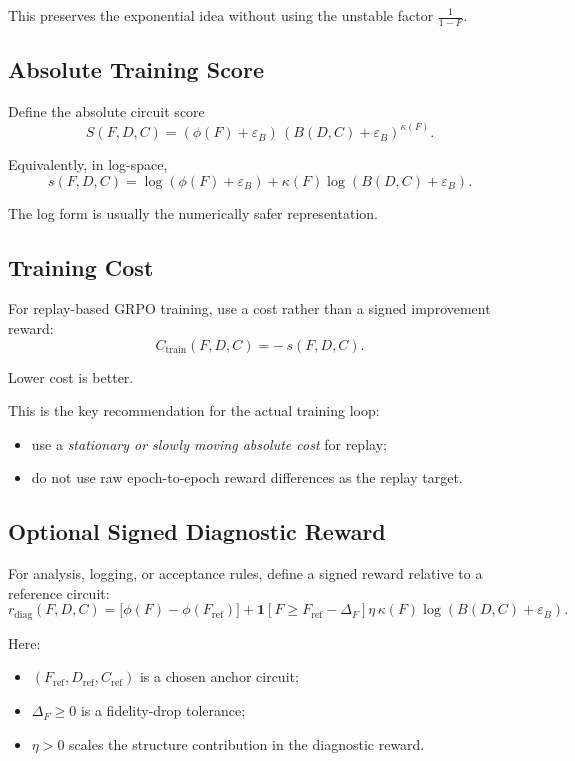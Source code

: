 \documentclass[11pt]{article}
\begin{document}
This preserves the exponential idea without using the unstable factor $\frac{1}{1-F}$.

\subsection{Absolute Training Score}

Define the absolute circuit score
\[
S(F,D,C)
=
\left(\phi(F)+\varepsilon_B\right)\,
\left(B(D,C)+\varepsilon_B\right)^{\kappa(F)}.
\]

Equivalently, in log-space,
\[
s(F,D,C)
=
\log\!\left(\phi(F)+\varepsilon_B\right)
+
\kappa(F)\log\!\left(B(D,C)+\varepsilon_B\right).
\]

The log form is usually the numerically safer representation.

\subsection{Training Cost}

For replay-based GRPO training, use a cost rather than a signed improvement reward:
\[
C_{\mathrm{train}}(F,D,C)
=
-\,s(F,D,C).
\]

Lower cost is better.

This is the key recommendation for the actual training loop:
\begin{itemize}[leftmargin=*]
\item use a \emph{stationary or slowly moving absolute cost} for replay;
\item do not use raw epoch-to-epoch reward differences as the replay target.
\end{itemize}

\subsection{Optional Signed Diagnostic Reward}

For analysis, logging, or acceptance rules, define a signed reward relative to a reference circuit:
\[
r_{\mathrm{diag}}(F,D,C)
=
\bigl[\phi(F)-\phi(F_{\mathrm{ref}})\bigr]
+
\mathbf{1}\!\left[F \ge F_{\mathrm{ref}}-\Delta_F\right]
\eta\,\kappa(F)\log\!\left(B(D,C)+\varepsilon_B\right).
\]

Here:

\begin{itemize}[leftmargin=*]
\item $(F_{\mathrm{ref}},D_{\mathrm{ref}},C_{\mathrm{ref}})$ is a chosen anchor circuit;
\item $\Delta_F \ge 0$ is a fidelity-drop tolerance;
\item $\eta > 0$ scales the structure contribution in the diagnostic reward.
\end{itemize}
\end{document}
